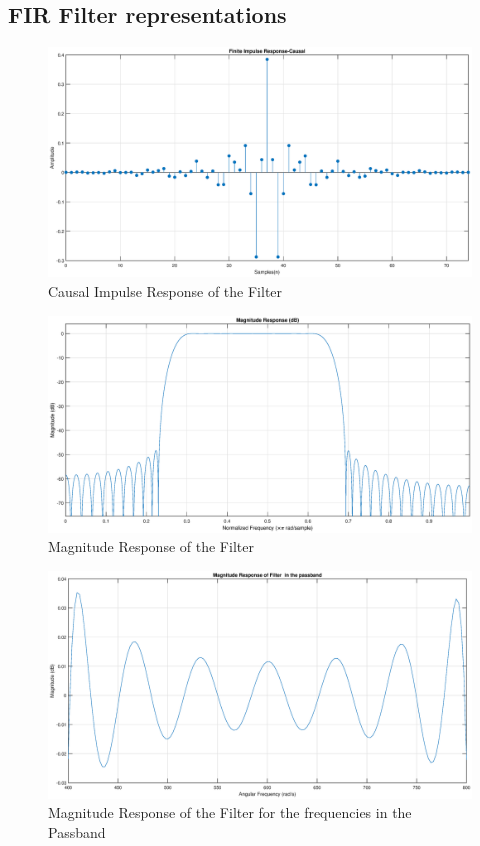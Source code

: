 \documentclass[a4paper,11pt]{article}%
\begin{document}
\subsection{FIR Filter representations}
\begin{figure}[!h]
	\centering
	\includegraphics[scale=0.4]{figures/causal-impulse-response}
	\caption{Causal Impulse Response of the Filter}
\end{figure}


\begin{figure}[!h]
	\centering
	\includegraphics[scale=0.4]{figures/magnitude-response}
	\caption{Magnitude Response of the Filter}
\end{figure}

\begin{figure}[!h]
	\centering
	\includegraphics[scale=0.4]{figures/magnitude-resp-passband}
	\caption{Magnitude Response of the Filter for the frequencies in the Passband}
\end{figure}
\end{document}

